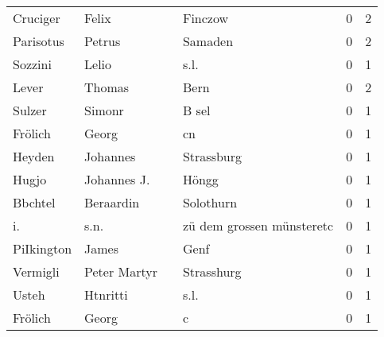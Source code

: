 \begin{tabular}{llllrr}
                 Cruciger &                              Felix &             &                                     Finczow &          0 &         2 \\
                Parisotus &                             Petrus &             &                                     Samaden &          0 &         2 \\
                  Sozzini &                              Lelio &             &                                        s.l. &          0 &         1 \\
                    Lever &                             Thomas &             &                                        Bern &          0 &         2 \\
                   Sulzer &                             Simonr &             &                                       B sel &          0 &         1 \\
                  Frölich &                              Georg &             &                                          cn &          0 &         1 \\
                   Heyden &                           Johannes &             &                                  Strassburg &          0 &         1 \\
                    Hugjo &                        Johannes J. &             &                                       Höngg &          0 &         1 \\
                  Bbchtel &                          Beraardin &             &                                   Solothurn &          0 &         1 \\
                       i. &                               s.n. &             &                   zü dem grossen münsteretc &          0 &         1 \\
               PiIkington &                              James &             &                                        Genf &          0 &         1 \\
                 Vermigli &                       Peter Martyr &             &                                  Strasshurg &          0 &         1 \\
                    Usteh &                           Htnritti &             &                                        s.l. &          0 &         1 \\
                  Frölich &                              Georg &             &                                           c &          0 &         1 \\

\end{tabular}
